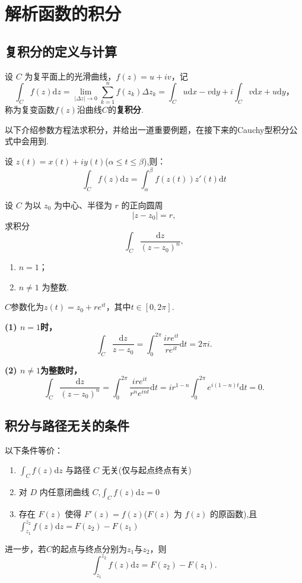 \documentclass[openany,oneside]{ctexbook}
\begin{document}
\section{解析函数的积分}
\subsection{复积分的定义与计算}
\begin{definition}
  设 $C$ 为复平面上的光滑曲线，$f(z) = u + iv$，记
\[
\int_C f(z)\mathrm{d}z =\lim_{|\Delta z|\rightarrow 0} \sum_{k=1}^n f(z_k)\Delta z_k = \int_C u\mathrm{d}x - v\mathrm{d}y + i\int_C v\mathrm{d}x + u\mathrm{d}y，
\]
称为复变函数$f(z)$沿曲线$C$的\textbf{复积分}.
\end{definition}
以下介绍参数方程法求积分，并给出一道重要例题，在接下来的\textrm{Cauchy}型积分公式中会用到.

设 $z(t) = x(t) + iy(t)$($\alpha \leq t \leq \beta$),则：
\[
\int_C f(z)\mathrm{d}z = \int_\alpha^\beta f(z(t))z'(t)\mathrm{d}t
\]  
\par\vspace{24pt}
\begin{example}
    设 $C$ 为以 $z_0$ 为中心、半径为 $r$ 的正向圆周
\[
|z-z_0|=r,
\]
求积分
\[
\int_C \frac{\mathrm{d}z}{(z-z_0)^n},
\]
\begin{enumerate}[(\arabic*)]
  \item $n=1$；
  \item $n\neq 1$ 为整数.
\end{enumerate}
\end{example}
\begin{solution}
    $C$参数化为$z(t) = z_0 + re^{it}$，其中$t \in [0,2\pi]$.

    \textbf{(1) $n=1$时，} $$\int_C \frac{\mathrm{d}z}{z-z_0} = \int_0^{2\pi} \frac{ire^{it}}{re^{it}} \mathrm{d}t = 2\pi i.$$
    
    \textbf{(2) $n\neq 1$为整数时，} $$\int_C \frac{\mathrm{d}z}{(z-z_0)^n} = \int_0^{2\pi} \frac{ire^{it}}{r^n e^{int}} \mathrm{d}t = ir^{1-n} \int_0^{2\pi} e^{i(1-n)t} \mathrm{d}t = 0.$$
\end{solution}
\subsection{积分与路径无关的条件}
\begin{theorem}[积分与路径无关的条件]\label{jifenlujingwuguan}
    以下条件等价：
    \begin{enumerate}\setlength{\itemsep}{0.5pt}
        \item $\int_C f(z)\mathrm{d}z$ 与路径 $C$ 无关(仅与起点终点有关)
        \item 对 $D$ 内任意闭曲线 $C$,$\int_C f(z)\mathrm{d}z = 0$
        \item 存在 $F(z)$ 使得 $F'(z) = f(z)$($F(z)$ 为 $f(z)$ 的原函数),且 $\int_{z_1}^{z_2} f(z)\mathrm{d}z = F(z_2) - F(z_1)$
    \end{enumerate}
    进一步，若$C$的起点与终点分别为$z_1$与$z_2$，则
    \[
        \int_{z_1}^{z_2} f(z)\mathrm{d}z = F(z_2) - F(z_1).
    \]
\end{theorem}
\end{document}
